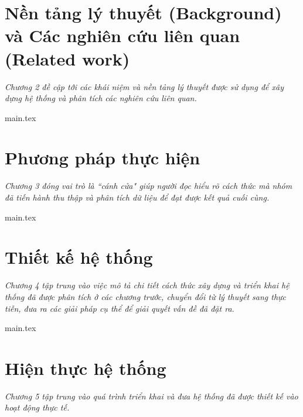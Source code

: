 \documentclass[a4paper, 12pt]{report}
\begin{document}
\chapter{Nền tảng lý thuyết (Background) và Các nghiên cứu liên quan (Related work)}\label{chap:chap2}
\thispagestyle{fancy} %

\textit{Chương 2 đề cập tới các khái niệm và nền tảng lý thuyết được sử dụng để xây dựng hệ thống và phân tích các nghiên cứu liên quan.}

{main.tex}

\chapter{Phương pháp thực hiện}\label{chap:chap3}
\thispagestyle{fancy} %

\textit{Chương 3 đóng vai trò là ``cánh cửa" giúp người đọc hiểu rõ cách thức mà nhóm đã tiến hành thu thập và phân tích dữ liệu để đạt được kết quả cuối cùng.}

\vspace{1cm}
{main.tex}

\chapter{Thiết kế hệ thống}\label{chap:chap4}
\thispagestyle{fancy} %

\textit{Chương 4 tập trung vào việc mô tả chi tiết cách thức xây dựng và triển khai hệ thống đã được phân tích ở các chương trước, chuyển đổi từ lý thuyết sang thực tiễn, đưa ra các giải pháp cụ thể để giải quyết vấn đề đã đặt ra.}

{main.tex}

\chapter{Hiện thực hệ thống}\label{chap:chap5}
\thispagestyle{fancy} %

\textit{Chương 5 tập trung vào quá trình triển khai và đưa hệ thống đã được thiết kế vào hoạt động thực tế.}
\end{document}

